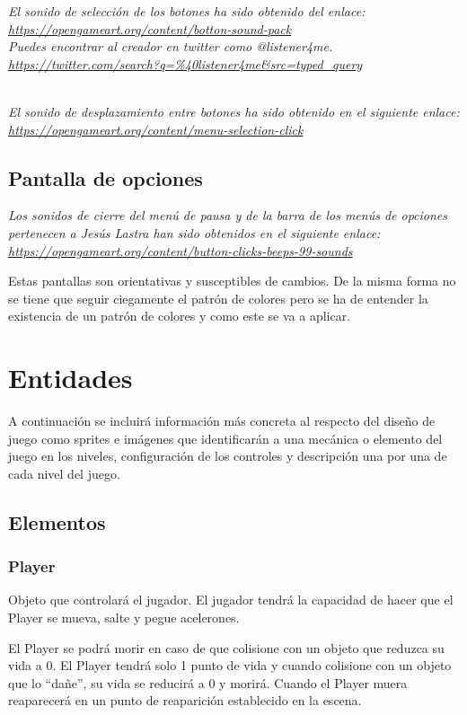 \textit{El sonido de selección de los botones ha sido obtenido del enlace: \url{https://opengameart.org/content/botton-sound-pack}}
\textit{\\Puedes encontrar al creador en twitter como @listener4me. \url{https://twitter.com/search?q=\%40listener4me&src=typed_query}}

\textit{\\El sonido de desplazamiento entre botones ha sido obtenido en el siguiente enlace: \url{https://opengameart.org/content/menu-selection-click}}

\subsection{Pantalla de opciones}

\textit{Los sonidos de cierre del menú de pausa y de la barra de los menús de opciones pertenecen a Jesús Lastra han sido obtenidos en el siguiente enlace: \url{https://opengameart.org/content/button-clicks-beeps-99-sounds}}

Estas pantallas son orientativas y susceptibles de cambios. De la misma forma no se tiene que seguir ciegamente el patrón de colores pero se ha de entender la existencia de un patrón de colores y como este se va a aplicar.

\section{Entidades}
A continuación se incluirá información más concreta al respecto del diseño de juego como sprites e imágenes que identificarán a una mecánica o elemento del juego en los niveles, configuración de los controles y descripción una por una de cada nivel del juego.

\subsection{Elementos}
\subsubsection{Player}
Objeto que controlará el jugador. El jugador tendrá la capacidad de hacer que el Player se mueva, salte y pegue acelerones.

El Player se podrá morir en caso de que colisione con un objeto que reduzca su vida a 0. El Player tendrá solo 1 punto de vida y cuando colisione con un objeto que lo “dañe”, su vida se reducirá a 0 y morirá. Cuando el Player muera reaparecerá en un punto de reaparición establecido en la escena.

